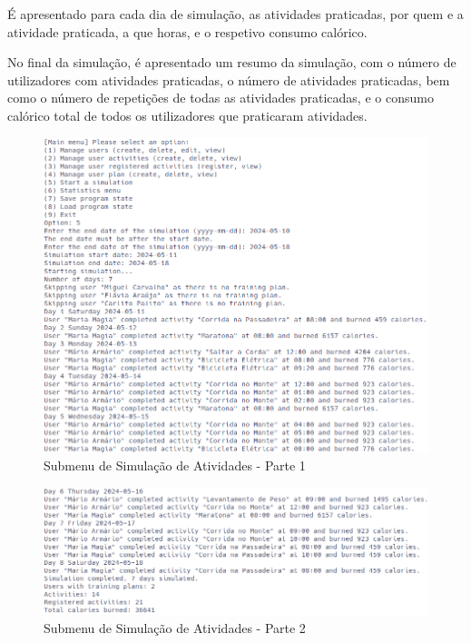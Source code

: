 \documentclass[a4paper,12pt]{scrreprt}
\begin{document}
    É apresentado para cada dia de simulação, as atividades praticadas,
    por quem e a atividade praticada, a que horas, e o respetivo consumo calórico.

    No final da simulação, é apresentado um resumo da simulação,
    com o número de utilizadores com atividades praticadas,
    o número de atividades praticadas,
    bem como o número de repetições de todas as atividades praticadas,
    e o consumo calórico total de todos os utilizadores que praticaram atividades.

    \begin{figure}[!ht]
        \centering
        \includegraphics[width=\textwidth]{images/Simulation1.png}
        \caption{Submenu de Simulação de Atividades - Parte 1}
        \label{fig:submenu-simulate-1}
    \end{figure}

    \begin{figure}[!ht]
        \centering
        \includegraphics[width=\textwidth]{images/Simulation2.png}
        \caption{Submenu de Simulação de Atividades - Parte 2}
        \label{fig:submenu-simulate-2}
    \end{figure}
\end{document}
